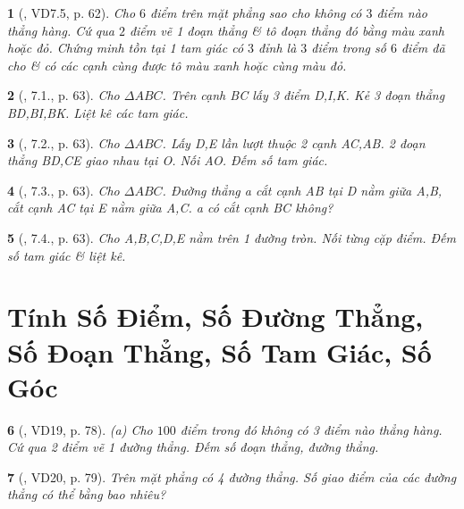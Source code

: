 \documentclass{article}
\newtheorem{baitoan}{}
\begin{document}
\begin{baitoan}[\cite{TLCT_THCS_Toan_6_hinh_hoc}, VD7.5, p. 62]
	Cho $6$ điểm trên mặt phẳng sao cho không có $3$ điểm nào thẳng hàng. Cứ qua $2$ điểm vẽ 1 đoạn thẳng \& tô đoạn thẳng đó bằng màu xanh hoặc đỏ. Chứng minh tồn tại 1 tam giác có $3$ đỉnh là $3$ điểm trong số $6$ điểm đã cho \& có các cạnh cùng được tô màu xanh hoặc cùng màu đỏ.
\end{baitoan}

\begin{baitoan}[\cite{TLCT_THCS_Toan_6_hinh_hoc}, 7.1., p. 63]
	Cho $\Delta ABC$. Trên cạnh BC lấy 3 điểm D,I,K. Kẻ 3 đoạn thẳng BD,BI,BK. Liệt kê các tam giác.
\end{baitoan}

\begin{baitoan}[\cite{TLCT_THCS_Toan_6_hinh_hoc}, 7.2., p. 63]
	Cho $\Delta ABC$. Lấy D,E lần lượt thuộc 2 cạnh AC,AB. 2 đoạn thẳng BD,CE giao nhau tại O. Nối AO. Đếm số tam giác.
\end{baitoan}

\begin{baitoan}[\cite{TLCT_THCS_Toan_6_hinh_hoc}, 7.3., p. 63]
	Cho $\Delta ABC$. Đường thẳng a cắt cạnh AB tại D nằm giữa A,B, cắt cạnh AC tại E nằm giữa A,C. a có cắt cạnh BC không?
\end{baitoan}

\begin{baitoan}[\cite{TLCT_THCS_Toan_6_hinh_hoc}, 7.4., p. 63]
	Cho A,B,C,D,E nằm trên 1 đường tròn. Nối từng cặp điểm. Đếm số tam giác \& liệt kê.
\end{baitoan}


\section{Tính Số Điểm, Số Đường Thẳng, Số Đoạn Thẳng, Số Tam Giác, Số Góc}

\begin{baitoan}[\cite{Binh_Toan_6_tap_2}, VD19, p. 78]
	(a) Cho $100$ điểm trong đó không có 3 điểm nào thẳng hàng. Cứ qua 2 điểm vẽ 1 đường thẳng. Đếm số đoạn thẳng, đường thẳng.
\end{baitoan}

\begin{baitoan}[\cite{Binh_Toan_6_tap_2}, VD20, p. 79]
	Trên mặt phẳng có 4 đường thẳng. Số giao điểm của các đường thẳng có thể bằng bao nhiêu?
\end{baitoan}
\end{document}
